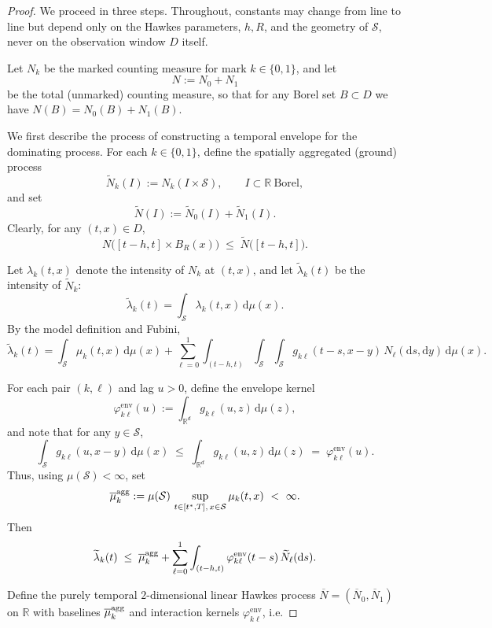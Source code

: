 \documentclass{statsoc}
\newcommand{\dd}{\mathrm{d}}
\newcommand{\bbR}{\mathbb{R}}
\newcommand{\1}{\mathbbm{1}}
\begin{document}
\begin{proof}
We proceed in three steps. Throughout, constants may change from line to line but depend only on the Hawkes parameters, $h,R$, and the geometry of $\mathcal{S}$, never on the observation window $D$ itself.

Let $N_k$ be the marked counting measure for mark $k\in\{0,1\}$, and let
\[
  N := N_0 + N_1
\]
be the total (unmarked) counting measure, so that for any Borel set $B\subset D$ we have $N(B)=N_0(B)+N_1(B)$.

We first describe the process of constructing a temporal envelope for the dominating process. For each $k\in\{0,1\}$, define the spatially aggregated (ground) process
\[
  \widetilde N_k(I)
  := N_k(I\times\mathcal{S}), \qquad I\subset\bbR\ \text{Borel},
\]
and set
\[
  \widetilde N(I) := \widetilde N_0(I)+\widetilde N_1(I).
\]
Clearly, for any $(t,x)\in D$,
\begin{equation}\label{eq:spatial-majorisation-app}
  N\bigl([t-h,t]\times B_R(x)\bigr)
  \;\le\; \widetilde N\bigl([t-h,t]\bigr).
\end{equation}

Let $\lambda_k(t,x)$ denote the intensity of $N_k$ at $(t,x)$, and let $\widetilde\lambda_k(t)$ be the intensity of $\widetilde N_k$:
\[
  \widetilde\lambda_k(t)
    = \int_{\mathcal{S}} \lambda_k(t,x)\,\dd\mu(x).
\]
By the model definition and Fubini,
\[
  \widetilde\lambda_k(t)
  = \int_{\mathcal{S}} \mu_k(t,x)\,\dd\mu(x)
    + \sum_{\ell=0}^1 \int_{(t-h,t)}\!\!\int_{\mathcal{S}}\!\int_{\mathcal{S}}
          g_{k\ell}(t-s,x-y)\,N_\ell(\dd s,\dd y)\,\dd\mu(x).
\]

For each pair $(k,\ell)$ and lag $u>0$, define the envelope kernel
\[
  \varphi^{\mathrm{env}}_{k\ell}(u)
  := \int_{\bbR^d} g_{k\ell}(u,z)\,\dd\mu(z),
\]
and note that for any $y\in\mathcal{S}$,
\[
  \int_{\mathcal{S}} g_{k\ell}(u,x-y)\,\dd\mu(x)
  \;\le\; \int_{\bbR^d} g_{k\ell}(u,z)\,\dd\mu(z)
  \;=\; \varphi^{\mathrm{env}}_{k\ell}(u).
\]
Thus, using \(\mu(\mathcal{S})<\infty\), set
\[
  \overline\mu_k^{\rm agg}
  := \mu(\mathcal{S})\,\sup_{t\in[t^\ast,T],\,x\in\mathcal{S}} \mu_k(t,x)
  \ <\ \infty.
\]
Then
\[
  \widetilde\lambda_k(t)
  \;\le\; \overline\mu_k^{\rm agg}
         + \sum_{\ell=0}^1 \int_{(t-h,t)}
                 \varphi^{\mathrm{env}}_{k\ell}(t-s)\,
                 \widetilde N_\ell(\dd s).
\]


Define the purely temporal \(2\)-dimensional linear Hawkes process \(\overline N=(\overline N_0,\overline N_1)\) on \(\bbR\) with baselines \(\overline\mu_k^{\rm agg}\) and interaction kernels \(\varphi^{\mathrm{env}}_{k\ell}\), i.e.


\end{proof}
\end{document}
